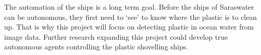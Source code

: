 The automation of the ships is a long term goal.
Before the ships of Saraswater can be autonomous, they first need to `see' to know where the plastic is to clean up.
That is why this project will focus on detecting plastic in ocean water from image data.
Further research expanding this project could develop true autonomous agents controlling the plastic shovelling ships.





\fi